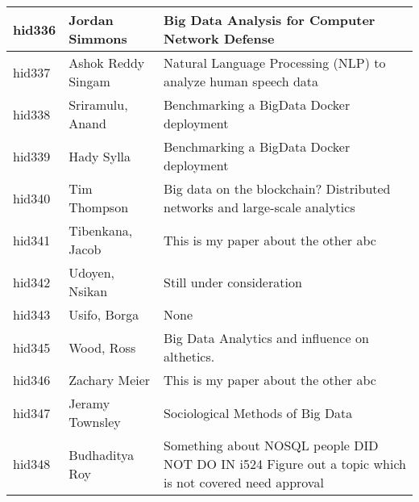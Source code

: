 \documentclass[12pt]{book}
\begin{document}
\begin{footnotesize}
\begin{longtable}{|p{1cm}p{5cm}p{9cm}|}
  \\
\hline
hid336 & Jordan Simmons & Big Data Analysis for Computer Network Defense  \\
\hline
hid337 & Ashok Reddy Singam & Natural Language Processing (NLP) to analyze human speech data  \\
\hline
hid338 & Sriramulu, Anand & Benchmarking a BigData Docker deployment  \\
\hline
hid339 & Hady Sylla & Benchmarking a BigData Docker deployment  \\
\hline
hid340 & Tim Thompson & Big data on the blockchain? Distributed networks and large-scale analytics  \\
\hline
hid341 & Tibenkana, Jacob & This is my paper about the other abc  \\
\hline
hid342 & Udoyen, Nsikan & Still under consideration  \\
\hline
hid343 & Usifo, Borga & None  \\
\hline
hid345 & Wood, Ross & Big Data Analytics and influence on althetics.  \\
\hline
hid346 & Zachary Meier & This is my paper about the other abc  \\
\hline
hid347 & Jeramy Townsley & Sociological Methods of Big Data  \\
\hline
hid348 & Budhaditya Roy & Something about NOSQL people DID NOT DO IN i524 Figure out a topic which is not covered need approval  \\
\hline
\end{longtable}
\end{footnotesize}
\newpage
\end{document}
